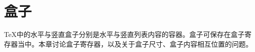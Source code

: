 \documentclass{book}
\begin{document}
\chapter{盒子}\label{boxes}

\TeX 中的水平与竖直盒子分别是水平与竖直列表内容的容器。盒子可保存在盒子寄存器当中。本章讨论盒子寄存器，以及关于盒子尺寸、盒子内容相互位置的问题。
\end{document}
